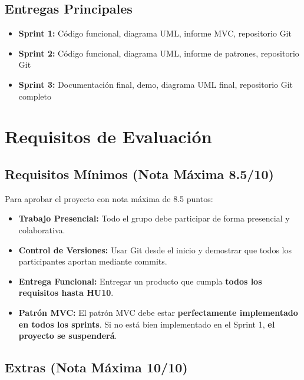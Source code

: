 \documentclass[12pt, a4paper]{article}
\begin{document}
\subsection{Entregas Principales}

\begin{itemize}[leftmargin=2em]
    \item \textbf{Sprint 1:} Código funcional, diagrama UML, informe MVC, repositorio Git
    \item \textbf{Sprint 2:} Código funcional, diagrama UML, informe de patrones, repositorio Git
    \item \textbf{Sprint 3:} Documentación final, demo, diagrama UML final, repositorio Git completo
\end{itemize}

\section{Requisitos de Evaluación}

\subsection{Requisitos Mínimos (Nota Máxima 8.5/10)}

Para aprobar el proyecto con nota máxima de 8.5 puntos:

\begin{itemize}[leftmargin=2em]
    \item \textbf{Trabajo Presencial:} Todo el grupo debe participar de forma presencial y colaborativa.
    
    \item \textbf{Control de Versiones:} Usar Git desde el inicio y demostrar que todos los participantes aportan mediante commits.
    
    \item \textbf{Entrega Funcional:} Entregar un producto que cumpla \textbf{todos los requisitos hasta HU10}.
    
    \item \textbf{Patrón MVC:} El patrón MVC debe estar \textbf{perfectamente implementado en todos los sprints}. Si no está bien implementado en el Sprint 1, \textcolor{rojopeligro}{\textbf{el proyecto se suspenderá}}.
\end{itemize}

\subsection{Extras (Nota Máxima 10/10)}
\end{document}
